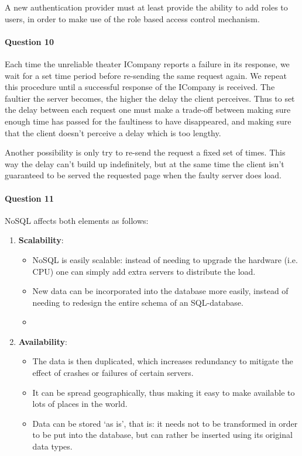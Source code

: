 \documentclass{ds-report}
\begin{document}
	A new authentication provider must at least provide the ability to add roles to users, in order to make use of the role based access control mechanism. 
	
	\paragraph{Question 10}
	Each time the unreliable theater ICompany reports a failure in its response, we wait for a set time period before re-sending the same request again. We repeat this procedure until a successful response of the ICompany is received. The faultier the server becomes, the higher the delay the client perceives. Thus to set the delay between each request
	one must make a trade-off between making sure enough time has passed for the faultiness to have disappeared, and making sure that the client doesn't perceive a delay which is too lengthy. 
	
	Another possibility is only try to re-send the request a fixed set of times. This way the delay can't build up indefinitely, but at the same time the client isn't guaranteed to be served the requested page when the faulty server does load. 
	
		\paragraph{Question 11} 
	NoSQL affects both elements as follows:
	\begin{enumerate}
		\item \textbf{Scalability}:
		\begin{itemize}
			\item NoSQL is easily scalable: instead of needing to upgrade the hardware (i.e. CPU) one can simply add extra servers to distribute the load. 
			\item New data can be incorporated into the database more easily, instead of needing to redesign the entire schema of an SQL-database.
			\item 
		\end{itemize}
		\item \textbf{Availability}:
		\begin{itemize}
			\item  The data is then duplicated, which increases redundancy to mitigate the effect of crashes or failures of certain servers.
			\item It can be spread geographically, thus making it easy to make available to lots of places in the world.
			\item Data can be stored `as is', that is: it needs not to be transformed in order to be put into the database, but can rather be inserted using its original data types.
		\end{itemize}
	\end{enumerate}
	
\end{document}
